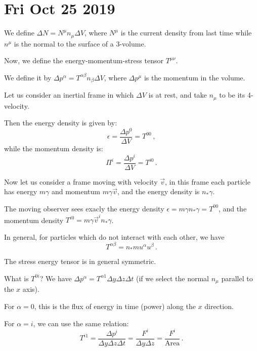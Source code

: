 \documentclass[main.tex]{subfiles}
\begin{document}
\section*{Fri Oct 25 2019}

We define \(\Delta N = N^{\mu }n_{\mu } \Delta V\), where \(N^{\mu }\) is the current density from last time while \(n^{\mu } \) is the normal to the surface of a 3-volume.

Now, we define the energy-momentum-stress tensor \(T^{\mu \nu }\).

We define it by \(\Delta p^{\alpha } = T^{\alpha \beta }n_{\beta }\Delta V\), where \(\Delta p^{\mu}\) is the momentum in the volume.

Let us consider an inertial frame in which \(\Delta V\) is at rest, and take \(n_{\mu }\) to be its 4-velocity.

Then the energy density is given by: 
%
\begin{equation}
  \epsilon  = \frac{\Delta p^{0}}{\Delta V} = T^{00}
\,,
\end{equation}
%
while the momentum density is: 
%
\begin{equation}
  \Pi^{i} = \frac{\Delta p^{i}}{\Delta V} = T^{i0}
\,.
\end{equation}

Now let us consider a frame moving with velocity \(\vec{v}  \), in this frame each particle has energy \(m \gamma \) and momentum \(m \gamma \vec{v}\), and the energy density is \(n_{*} \gamma \).

The moving observer sees exacly the energy density \(\epsilon = m \gamma n_{*} \gamma  = T^{00}\), and the momentum density \(T^{i0} = m \gamma \vec{v}^{i} n_{*}\gamma \).

In general, for particles which do not interact with each other, we have 
%
\begin{equation}
  T^{\alpha \beta } = n_{*} m u^{\alpha }u^{\beta }
\,.
\end{equation}

The stress energy tensor is in general symmetric.

What is \(T^{0i}\)? We have \(\Delta p^{\alpha } = T^{\alpha 1} \Delta y \Delta z \Delta t\) (if we select the normal \(n_{\mu }\) parallel to the \(x\) axis).

For \(\alpha = 0\), this is the flux of energy in time (power) along the \(x\) direction.

For \(\alpha = i\), we can use the same relation: 
%
\begin{equation}
  T^{i1} = \frac{\Delta p^{i}}{\Delta y \Delta z \Delta t}
  = \frac{F^{i}}{\Delta y \Delta z} = \frac{F^{i}}{\text{Area}}
\,.
\end{equation}
\end{document}
